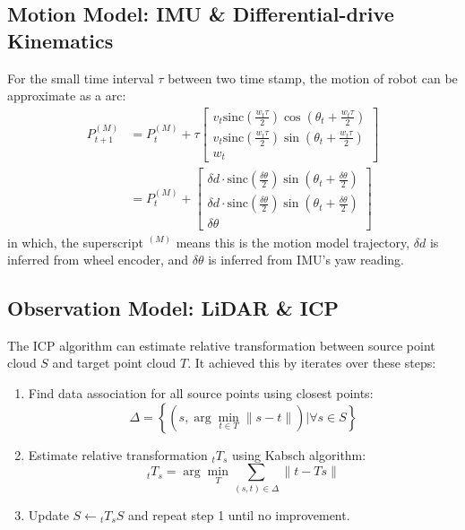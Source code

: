 \documentclass[conference]{IEEEtran}
\begin{document}
\subsection{Motion Model: IMU \& Differential-drive Kinematics}
For the small time interval $\tau$ between two time stamp, 
the motion of robot can be approximate as a arc:
$$
\begin{aligned}
    P_{t+1}^{(M)}
    &=P_{t}^{(M)} +\tau \left[ \begin{gathered}v_{t}\mathrm{sinc} \left( \frac{w_{t}\tau }{2} \right)  \cos \left( \theta_{t} +\frac{w_{t}\tau }{2} \right)  \\ v_{t}\mathrm{sinc} \left( \frac{w_{t}\tau }{2} \right)  \sin \left( \theta_{t} +\frac{w_{t}\tau }{2} \right)  \\ w_{t}\end{gathered} \right]  \\
    &=P_{t}^{(M)} +\left[ \begin{gathered}\delta d\cdot \mathrm{sinc} \left( \frac{\delta \theta }{2} \right)  \sin \left( \theta_{t} +\frac{\delta \theta }{2} \right)  \\ \delta d\cdot \mathrm{sinc} \left( \frac{\delta \theta }{2} \right)  \sin \left( \theta_{t} +\frac{\delta \theta }{2} \right)  \\ \delta \theta \end{gathered} \right]
\end{aligned} 
$$
in which, the superscript $^{(M)}$ means this is the motion model trajectory,
$\delta d$ is inferred from wheel encoder, and $\delta \theta$ is inferred from IMU's yaw reading.


\subsection{Observation Model: LiDAR \& ICP}
The ICP algorithm can estimate relative transformation between 
source point cloud $S$ and target point cloud $T$.
It achieved this by iterates over these steps:
\begin{enumerate}
    \item Find data association for all source points using closest points:
    $$ \Delta = \left\{\left(s, \arg\min_{t\in T} \|s - t\| \right) | \forall s\in S\right\}$$

    \item Estimate relative transformation $_tT_s$ using Kabsch algorithm:
    $$_tT_s = \arg\min_T \sum\limits_{(s,t)\in\Delta} \|t - Ts\|$$

    \item Update $S \leftarrow {}_tT_s S$ and repeat step 1 until no improvement.
\end{enumerate}
\end{document}
